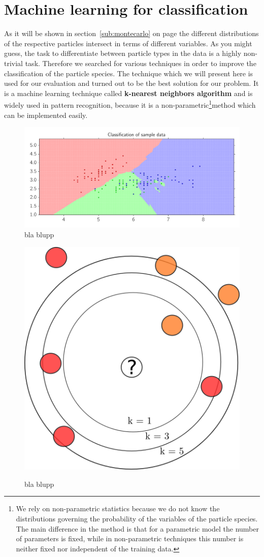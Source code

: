 \section{Machine learning for classification}
As it will be shown in section~\ref{sub:montecarlo} on page \pageref{sub:montecarlo} 
the different distributions of the respective particles intersect in terms of different
variables. As you might guess, the task to differentiate between particle types in the 
data is a highly non-trivial task. Therefore we searched for various techniques in order
to improve the classification of the particle species. The technique which we will present
here is used for our evaluation and turned out to be the best solution for our problem.
It is a machine learning technique called \textbf{k-nearest neighbors algorithm} and
is widely used in pattern recognition, because it is a non-parametric\footnote{
We rely on non-parametric statistics because we do not know the distributions governing
the probability of the variables of the particle species. 
The main difference in the method is that for a parametric model
the number of parameters is fixed, while in non-parametric techniques this number is 
neither fixed nor independent of the training data.
}method which can
be implemented easily.
\begin{figure}[htpb]
    \centering
    \includegraphics[width=1\linewidth]{figures/kneigbors}
    \caption{bla blupp}
\label{fig:kneigbors}
\end{figure}

\begin{figure}
    \centering
    \caption{bla blupp}
    \includegraphics[width=0.5\linewidth]{figures/knn_schema}
\label{fig:knn_schema}
\end{figure}
